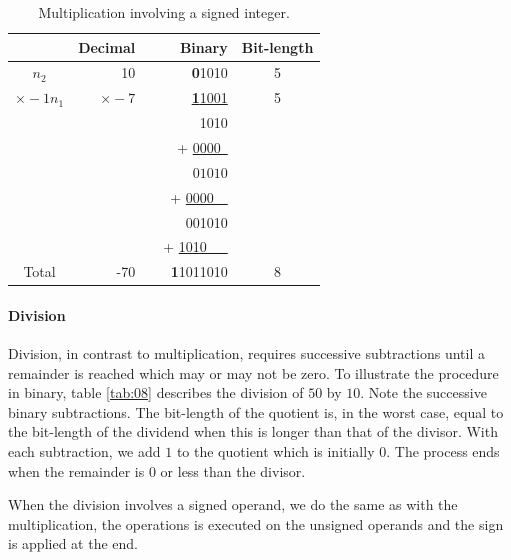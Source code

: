 \documentclass[10pt]{article}
\begin{document}
\begin{table}[ht]
    \centering
    \caption{Multiplication involving a signed integer.}
    \begin{tabular}{crrrc}
    \hline
    	  & Decimal & & Binary & Bit-length \\
    \hline      
    $n_2$ & 10	& & \textbf{0}1010 & 5 \\
    $\times -1n_1$ & \underline{$\times -7$} & & \underline{\textbf{1}1001} & 5
\\
    & & & 1010  & \\
    & & & + \underline{0000\ } & \\
    & & & $\,01010$ & \\
    & & & + \underline{0000\ \ } & \\
    & & & 001010 & \\
    & & & + \underline{1010\ \ \ } & \\
    Total& -70 & & \textbf{1}1011010 & 8\\
    \hline
	\end{tabular}
    \label{tab:07}
\end{table}

\paragraph{Division}
Division, in contrast to multiplication, requires successive subtractions until
a remainder is reached which may or may not be zero. To illustrate the
procedure in binary, table \ref{tab:08} describes the division of $50$ by $10$.
Note the successive binary subtractions. The bit-length of the quotient is, in
the worst case, equal to the bit-length of the dividend when this is longer
than that of the divisor. With each subtraction, we add $1$ to the quotient
which is initially $0$. The process ends when the remainder is $0$ or less than
the divisor.

When the division involves a signed operand, we do the same as with the
multiplication, the operations is executed on the unsigned operands and the
sign is applied at the end.
\end{document}
